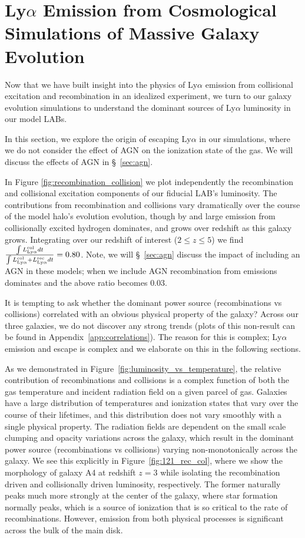 \section{Ly\texorpdfstring{$\alpha$}{a} Emission from Cosmological Simulations of Massive Galaxy Evolution}

Now that we have built insight into the physics of Ly$\alpha$ emission from collisional excitation and recombination in an idealized experiment, we turn to our galaxy evolution simulations to understand the dominant sources of Ly$\alpha$ luminosity in our model LABs.

In this section, we explore the origin of escaping Ly$\alpha$ in our simulations, where we do not consider the effect of AGN on the ionization state of the gas.
We will discuss the effects of AGN in \S~\ref{sec:agn}.

In Figure \ref{fig:recombination_collision} we plot independently the recombination and collisional excitation components of our fiducial LAB's luminosity.
The contributions from recombination and collisions vary dramatically over the course of the model halo's evolution evolution, though by and large emission from collisionally excited hydrogen dominates, and grows over redshift as this galaxy grows.
Integrating over our redshift of interest ($2 \leq z \leq 5$) we find $\frac{\int L_{\rm Ly \alpha}^{\rm col} dt}{\int L_{\rm Ly \alpha}^{\rm col} + L_{\rm Ly \alpha}^{\rm rec} dt} = 0.80$.
Note, we will \S~\ref{sec:agn} discuss the impact of including an AGN in these models; when we include AGN recombination from emissions dominates and the above ratio becomes $0.03$.

It is tempting to ask whether the dominant power source (recombinations vs collisions) correlated with an obvious physical property of the galaxy?
Across our three galaxies, we do not discover any strong trends (plots of this non-result can be found in Appendix~\ref{app:correlations}).
The reason for this is complex; Ly$\alpha$ emission and escape is complex and we elaborate on this in the following sections.

As we demonstrated in Figure~\ref{fig:luminosity_vs_temperature}, the relative contribution of recombinations and collisions is a complex function of both the gas temperature and incident radiation field on a given parcel of gas.
Galaxies have a large distribution of temperatures and ionization states that vary over the course of their lifetimes, and this distribution does not vary smoothly with a single physical property.
The radiation fields are dependent on the small scale clumping and opacity variations across the galaxy, which result in the dominant power source (recombinations vs collisions) varying non-monotonically across the galaxy.
We see this explicitly in Figure~\ref{fig:121_rec_col}, where we show the morphology of galaxy A4 at redshift $z=3$ while isolating the recombination driven and collisionally driven luminosity, respectively.
The former naturally peaks much more strongly at the center of the galaxy, where star formation normally peaks, which is a source of ionization that is so critical to the rate of recombinations.
However, emission from both physical processes is significant across the bulk of the main disk.

